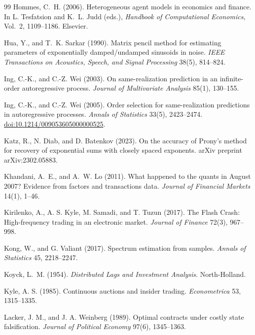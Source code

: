 \documentclass[12pt]{article}
\theoremstyle{definition}
\theoremstyle{remark}
\begin{document}
\begin{thebibliography}{99}
 Hommes, C.~H. (2006). Heterogeneous agent models in economics and finance. In L. Tesfatsion and K.~L. Judd (eds.), \emph{Handbook of Computational Economics}, Vol.~2, 1109--1186. Elsevier.

 Hua, Y., and T.~K. Sarkar (1990). Matrix pencil method for estimating parameters of exponentially damped/undamped sinusoids in noise. \emph{IEEE Transactions on Acoustics, Speech, and Signal Processing} 38(5), 814--824.

 Ing, C.-K., and C.-Z. Wei (2003). On same-realization prediction in an infinite-order autoregressive process. \emph{Journal of Multivariate Analysis} 85(1), 130--155.

 Ing, C.-K., and C.-Z. Wei (2005). Order selection for same-realization predictions in autoregressive processes. \emph{Annals of Statistics} 33(5), 2423--2474. \href{https://doi.org/10.1214/009053605000000525}{doi:10.1214/009053605000000525}.

 Katz, R., N. Diab, and D. Batenkov (2023). On the accuracy of Prony's method for recovery of exponential sums with closely spaced exponents. arXiv preprint arXiv:2302.05883.

 Khandani, A.~E., and A.~W. Lo (2011). What happened to the quants in August 2007? Evidence from factors and transactions data. \emph{Journal of Financial Markets} 14(1), 1--46.

 Kirilenko, A., A. S. Kyle, M. Samadi, and T. Tuzun (2017). The Flash Crash: High-frequency trading in an electronic market. \emph{Journal of Finance} 72(3), 967--998.

 Kong, W., and G. Valiant (2017). Spectrum estimation from samples. \emph{Annals of Statistics} 45, 2218--2247.

 Koyck, L.~M. (1954). \emph{Distributed Lags and Investment Analysis}. North-Holland.

 Kyle, A. S. (1985). Continuous auctions and insider trading. \emph{Econometrica} 53, 1315--1335.

 Lacker, J. M., and J. A. Weinberg (1989). Optimal contracts under costly state falsification. \emph{Journal of Political Economy} 97(6), 1345--1363.


\end{thebibliography}
\end{document}
